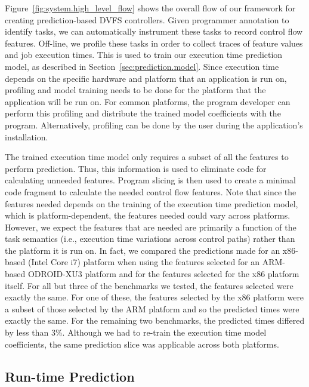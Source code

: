 Figure~\ref{fig:system.high_level_flow} shows the overall flow of our framework
for creating prediction-based DVFS controllers. Given programmer annotation to
identify tasks, we can automatically instrument these tasks to record control flow
features. Off-line, we profile these tasks in order to collect
traces of feature values and job execution times.
This is used to train our execution time prediction model, as
described in Section~\ref{sec:prediction.model}. Since execution time depends
on the specific hardware and platform that an application is run on, profiling
and model training needs to be done for the platform that the application will
be run on. For common platforms, the program developer can perform this
profiling and distribute the trained model coefficients with the program.
Alternatively, profiling can be done by the user during the application's
installation.

The trained execution time model only requires a subset of all the features to
perform prediction. Thus, this information is used to eliminate code for
calculating unneeded features. 
Program slicing is then used to create a minimal code fragment to calculate
the needed control flow features. 
Note that since the
features needed depends on the training of the execution time prediction model,
which is platform-dependent, the features needed could vary across platforms.
However, we expect the features that are needed are primarily a function of the
task semantics (i.e., execution time variations across control paths) rather
than the platform it is run on. In fact, we compared the predictions made for
an x86-based (Intel Core i7) platform when using the features selected for an
ARM-based ODROID-XU3 platform and for the features selected for the x86
platform itself. For all but three of the benchmarks we tested, the features
selected were exactly the same.  For one of these, the features selected by the
x86 platform were a subset of those selected by the ARM platform and so the
predicted times were exactly the same. For the remaining two benchmarks, the
predicted times differed by less
than 3\%. Although we had to re-train the execution time model coefficients,
the same prediction slice was applicable across both platforms.

\subsection{Run-time Prediction}

